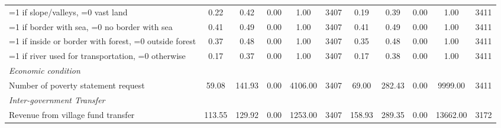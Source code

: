 \begin{tabular}{l*{2}{ccccc}}
\hspace{0.25cm} =1 if slope/valleys, =0 vast land&     0.22&     0.42&     0.00&     1.00&     3407&     0.19&     0.39&     0.00&     1.00&     3411\\
\hspace{0.25cm} =1 if border with sea, =0 no border with sea&     0.41&     0.49&     0.00&     1.00&     3407&     0.41&     0.49&     0.00&     1.00&     3411\\
\hspace{0.25cm} =1 if inside or border with forest, =0 outside forest&     0.37&     0.48&     0.00&     1.00&     3407&     0.35&     0.48&     0.00&     1.00&     3411\\
\hspace{0.25cm} =1 if river used for transportation, =0 otherwise&     0.17&     0.37&     0.00&     1.00&     3407&     0.17&     0.38&     0.00&     1.00&     3411\\
\emph{Economic condition}&         &         &         &         &         &         &         &         &         &         \\
\hspace{0.25cm} Number of poverty statement request&    59.08&   141.93&     0.00&  4106.00&     3407&    69.00&   282.43&     0.00&  9999.00&     3411\\
\emph{Inter-government Transfer}&         &         &         &         &         &         &         &         &         &         \\
\hspace{0.25cm} Revenue from village fund transfer&   113.55&   129.92&     0.00&  1253.00&     3407&   158.93&   289.35&     0.00& 13662.00&     3172\\
\bottomrule
\end{tabular}
